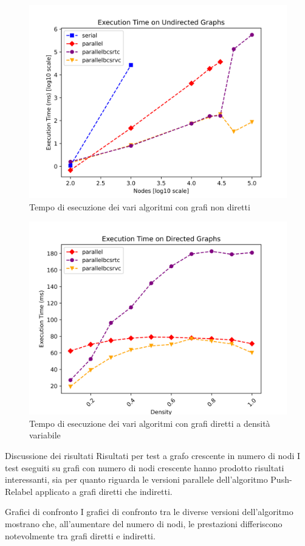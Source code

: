     \begin{figure}
        \centering
        \includegraphics[width=0.7\linewidth]{images/execution_time_undirected.png}
        \caption{Tempo di esecuzione dei vari algoritmi con grafi non diretti}
        \label{fig:exec-time-undir}
    \end{figure}

    \begin{figure}
        \centering
        \includegraphics[width=0.7\linewidth]{images/execution_time_density.png}
        \caption{Tempo di esecuzione dei vari algoritmi con grafi diretti a densità variabile}
        \label{fig:exec-time-density}
    \end{figure}





\newpage
Discussione dei risultati
Risultati per test a grafo crescente in numero di nodi
I test eseguiti su grafi con numero di nodi crescente hanno prodotto risultati interessanti, sia per quanto riguarda le versioni parallele dell'algoritmo Push-Relabel applicato a grafi diretti che indiretti.

Grafici di confronto
I grafici di confronto tra le diverse versioni dell'algoritmo mostrano che, all'aumentare del numero di nodi, le prestazioni differiscono notevolmente tra grafi diretti e indiretti.

